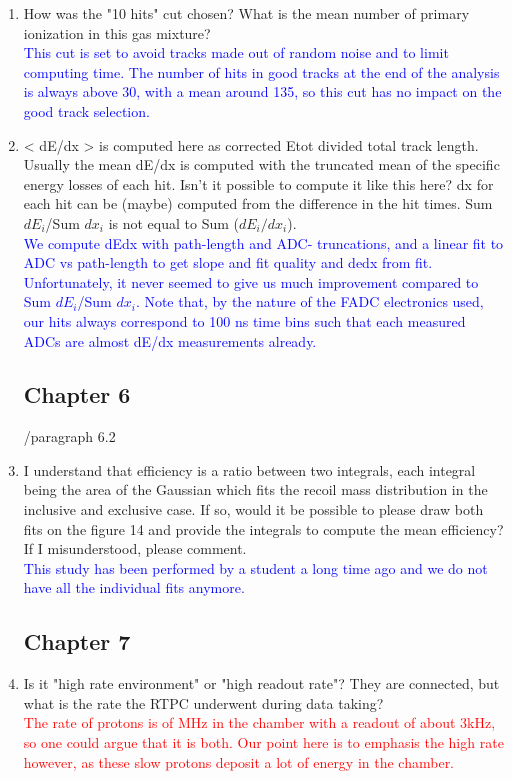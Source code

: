 \documentclass[a4paper,11pt,twoside]{article}
\begin{document}
\begin{enumerate}
\item How was the "10 hits" cut chosen? What is the mean number of primary 
   ionization in this gas mixture?\\
   \textcolor{blue}{This cut is set to avoid tracks made out of random noise and
to limit computing time. The number of hits in good tracks at the end of the 
analysis is always above 30, with a mean around 135, so this cut has no impact 
on the good track selection.}

\item < dE/dx > is computed here as corrected Etot divided total track length. 
   Usually the mean dE/dx is computed with the truncated mean of the specific 
   energy losses of each hit. Isn't it possible to compute it like this here? 
   dx for each hit can be (maybe) computed from the difference in the hit 
   times. Sum $dE_{i}$/Sum $dx_{i}$ is not equal to Sum ($dE_{i}/dx_{i}$).\\
\textcolor{blue}{We compute dEdx with path-length and ADC- 
truncations, and a linear fit to ADC vs path-length to get slope and fit 
quality and dedx from fit. Unfortunately, it never seemed to give us much 
improvement compared to Sum $dE_{i}$/Sum $dx_{i}$. Note that, by the nature of 
the FADC electronics used, our hits always correspond to 100 ns time bins such that
each measured ADCs are almost dE/dx measurements already.}

\subsection*{ Chapter 6}

        /paragraph 6.2
\item I understand that efficiency is a ratio between two integrals, each 
   integral being the area of the Gaussian which fits the recoil mass 
   distribution in the inclusive and exclusive case. If so, would it be 
   possible to please draw both fits on the figure 14 and provide the integrals 
   to compute the mean efficiency? If I misunderstood, please comment.\\
\textcolor{blue}{This study has been performed by a student a long time
ago and we do not have all the individual fits anymore.} 

\subsection*{ Chapter 7} 

\item Is it "high rate environment" or "high readout rate"? They are connected, 
   but what is the rate the RTPC underwent during data taking?\\
\textcolor{red}{The rate of protons is of MHz in the chamber with a readout of
about 3kHz, so one could argue that it is both. Our point here is to emphasis
the high rate however, as these slow protons deposit a lot of energy in the 
chamber.} 


\end{enumerate}
\end{document}
